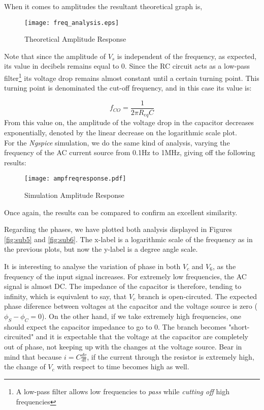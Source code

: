 When it comes to amplitudes the resultant theoretical graph is,

\begin{figure}[h]
    \centering
  \texttt{[image: freq\_analysis.eps]}
  \caption{Theoretical Amplitude Response}
  \label{fig:sub3}
\end{figure}

Note that since the amplitude of $V_s$ is independent of the frequency, as expected, its value in decibels remains equal to 0.
Since the RC circuit acts as a low-pass filter\footnote{A low-pass filter allows low frequencies to \textit{pass} while \textit{cutting off} high frequencies} its voltage drop remains almost constant until a certain turning point. This turning point is denominated the cut-off frequency, and in this case its value is: 

\begin{equation}
f_{CO}=\frac{1}{2\pi R_{eq}C} \nonumber
\end{equation}
From this value on, the amplitude of the voltage drop in the capacitor decreases exponentially, denoted by the linear decrease on the logarithmic scale plot.\\

For the \textit{Ngspice} simulation, we do the same kind of analysis, varying the frequency of the AC current source from 0.1Hz to 1MHz, giving off the following results:
\clearpage

\begin{figure}[h]
  \centering
  \texttt{[image: ampfreqresponse.pdf]}
  \caption{Simulation Amplitude Response}
  \label{fig:sub4}
\end{figure}

Once again, the results can be compared to confirm an excellent similarity.

Regarding the phases, we have plotted both analysis displayed in Figures \ref{fig:sub5} and \ref{fig:sub6}. The x-label is a logarithmic scale of the frequency as in the previous plots, but now the y-label is a degree angle scale.  

It is interesting to analyse the variation of phase in both $V_c$ and $V_6$, as the frequency of the input signal increases. For extremely low frequencies, the AC signal is almost DC. The impedance of the capacitor is therefore, tending to infinity, which is equivalent to say, that $V_c$ branch is open-circuted. The expected phase diference between voltages at the capacitor and the voltage source is zero ($\phi_S - \phi_C = 0 $). On the other hand, if we take extremely high frequencies, one should expect the capacitor impedance to go to 0. The branch becomes "short-circuited" and it is expectable that the voltage at the capacitor are completely out of phase, not keeping up with the changes at the voltage source. Bear in mind that because $i = C \frac{dv}{dt}$, if the current through the resistor is extremely high, the change of $V_c$ with respect to time becomes high as well.


